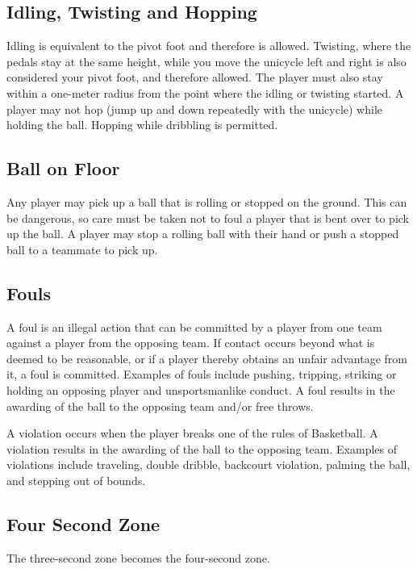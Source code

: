 \subsection{Idling, Twisting and Hopping}

Idling is equivalent to the pivot foot and therefore is allowed.
Twisting, where the pedals stay at the same height, while you move the unicycle left and right is also considered your pivot foot, and therefore allowed.
The player must also stay within a one-meter radius from the point where the idling or twisting started.
A player may not hop (jump up and down repeatedly with the unicycle) while holding the ball.
Hopping while dribbling is permitted.

\subsection{Ball on Floor}
Any player may pick up a ball that is rolling or stopped on the ground.
This can be dangerous, so care must be taken not to foul a player that is bent over to pick up the ball.
A player may stop a rolling ball with their hand or push a stopped ball to a teammate to pick up.

\subsection{Fouls}

A foul is an illegal action that can be committed by a player from one team against a player from the opposing team.
If contact occurs beyond what is deemed to be reasonable, or if a player thereby obtains an unfair advantage from it, a foul is committed.
Examples of fouls include pushing, tripping, striking or holding an opposing player and unsportsmanlike conduct.
A foul results in the awarding of the ball to the opposing team and/or free throws.

A violation occurs when the player breaks one of the rules of Basketball.
A violation results in the awarding of the ball to the opposing team.
Examples of violations include traveling, double dribble, backcourt violation, palming the ball, and stepping out of bounds.

\subsection{Four Second Zone}

The three-second zone becomes the four-second zone.
